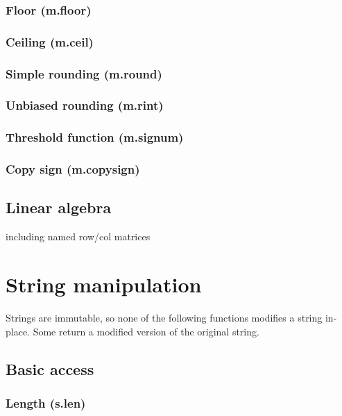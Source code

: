\documentclass{article}
\theoremstyle{definition}
\begin{document}
\subsubsection{Floor (m.floor)}

\subsubsection{Ceiling (m.ceil)}

\subsubsection{Simple rounding (m.round)}

\subsubsection{Unbiased rounding (m.rint)}

\subsubsection{Threshold function (m.signum)}

\subsubsection{Copy sign (m.copysign)}

\subsection{Linear algebra}

including named row/col matrices

\pagebreak

\section{String manipulation}

Strings are immutable, so none of the following functions modifies a string in-place.  Some return a modified version of the original string.

\subsection{Basic access}

\subsubsection{Length (s.len)}
\end{document}
